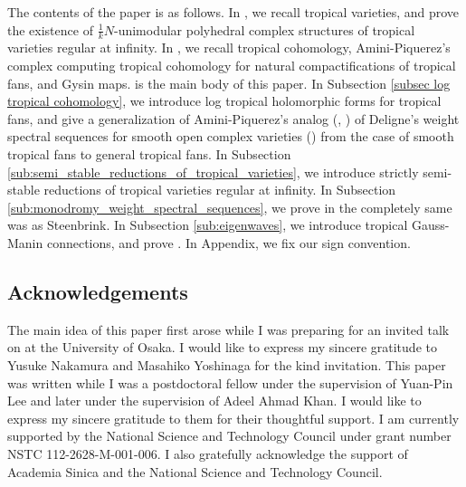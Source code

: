 \documentclass[12pt,a4]{amsart}
\numberwithin{equation}{section}
\numberwithin{figure}{section}
\begin{document}
  The contents of the paper is as follows. 
   In , we recall tropical varieties, 
   and prove the existence of $\frac{1}{k}N$-unimodular polyhedral complex structures of 
   tropical varieties regular at infinity. 
   In , 
   we recall tropical cohomology, 
   Amini-Piquerez's complex computing tropical cohomology 
   for natural compactifications of tropical fans, 
   and Gysin maps. 
   is the main body of this paper. 
   In Subsection \ref{subsec log tropical cohomology}, 
   we introduce log tropical holomorphic forms 
    for tropical fans, 
    and give 
    a generalization of Amini-Piquerez's analog  
  (\cite{AminiPiquerezHomologyoftropicalfans2021},  \cite{AminiPiquerezHomologicalsmoothnessandDeligneresolutionfortropicalfans2024}) of 
    Deligne's weight spectral sequences for smooth open complex varieties (\cite{DeligneThoriedeHodgeII1972})
  from the case of smooth tropical fans
  to general tropical fans.
   In Subsection \ref{sub:semi_stable_reductions_of_tropical_varieties}, 
    we introduce strictly semi-stable reductions of tropical varieties regular at infinity. 
   In Subsection \ref{sub:monodromy_weight_spectral_sequences}, 
    we prove  in the completely same was as Steenbrink. 
   In Subsection \ref{sub:eigenwaves}, 
    we introduce tropical Gauss-Manin connections,
     and 
    prove .     
   In Appendix, we fix our sign convention.


\subsection*{Acknowledgements}
The main idea of this paper first arose while I was preparing for an invited talk on \cite{AminiPiquerezHodgetheoryfortropicalvarieties2020} 
at the University of Osaka. 
I would like to express my sincere gratitude to 
Yusuke Nakamura and Masahiko Yoshinaga for the kind invitation.
This paper was written while I was a postdoctoral fellow under the supervision of Yuan-Pin Lee
and later under the supervision of Adeel Ahmad Khan.
I would like to express my sincere gratitude to them for their thoughtful support.
  I am currently supported by the National Science and Technology Council under grant number NSTC 112-2628-M-001-006.
I also gratefully acknowledge the support of Academia Sinica and the National Science and Technology Council.
\end{document}
